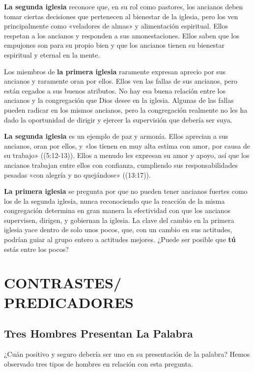 \documentclass[12pt, twoside, openright]{book}
\begin{document}
\textbf{La segunda iglesia} reconoce que, en su rol como pastores, los ancianos deben tomar ciertas decisiones que pertenecen al bienestar de la iglesia, pero los ven principalmente como «veladores de almas» y alimentación espiritual. Ellos respetan a los ancianos y responden a sus amonestaciones. Ellos saben que los empujones son para su propio bien y que los ancianos tienen su bienestar espiritual y eternal en la mente. 

Los miembros de \textbf{la primera iglesia} raramente expresan aprecio por sus ancianos y raramente oran por ellos. Ellos ven las fallas de sus ancianos, pero están cegados a sus buenos atributos. No hay esa buena relación entre los ancianos y la congregación que Dios desee en la iglesia. Algunas de las fallas pueden radicar en los mismos ancianos, pero la congregación realmente no les ha dado la oportunidad de dirigir y ejercer la supervisión que debería ser suya. 

\textbf{La segunda iglesia} es un ejemplo de paz y armonía. Ellos aprecian a sus ancianos, oran por ellos, y «los tienen en muy alta estima con amor, por causa de su trabajo» ((5:12-13)). Ellos a menudo les expresan su amor y apoyo, así que los ancianos trabajan entre ellos con confianza, cumpliendo sus responsabilidades pesadas «con alegría y no quejándose» ((13:17)). 

\textbf{La primera iglesia} se pregunta por que no pueden tener ancianos fuertes como los de la segunda iglesia, nunca reconociendo que la reacción de la misma congregación determina en gran manera la efectividad con que los ancianos supervisen, dirigen, y gobiernan la iglesia. La clave del cambio en la primera iglesia yace dentro de solo unos pocos, que, con un cambio en sus actitudes, podrían guiar al grupo entero a actitudes mejores. ¿Puede ser posible que \textbf{tú} estás entre los pocos?

\chapter{CONTRASTES/\\PREDICADORES}

\section{Tres Hombres Presentan La Palabra}
¿Cuán positivo y seguro debería ser uno en su presentación de la palabra? Hemos observado tres tipos de hombres en relación con esta pregunta.
\end{document}
